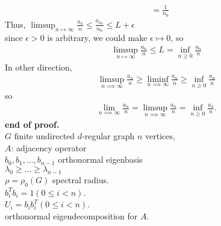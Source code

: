 \documentclass{article}
\begin{document}
\begin{homeworkProblem}
\begin{align}
        &= \frac{ 1 }{ n_0 }
    \end{align}
    Thus, $\limsup_{n \mapsto \infty} \frac{ a_n }{ n } \leq \frac{ a_{n_0} }{ n_0 } \leq L + \epsilon$\\
    since $\epsilon > 0$ is arbitrary, we could make $\epsilon \mapsto 0$, so
    \begin{align}
        \limsup_{n \mapsto \infty} \frac{ a_n }{ n } \leq L = \inf_{n \geq 0} \frac{ a_{n} }{ n }
    \end{align}
    In other direction,
    \begin{align}
        \limsup_{n \implies \infty} \frac{ a_n }{ n } 
        \geq \liminf_{n \implies \infty} \frac{ a_n }{ n } \geq \inf_{n\geq 0} \frac{ a_n }{ n }
    \end{align}
    so 
    \begin{align}
        \lim_{n \implies \infty} \frac{ a_n }{ n } = \limsup_{n \implies \infty} \frac{ a_n }{ n } 
        = \inf_{n\geq 0} \frac{ a_n }{ n }.
    \end{align}
    \textbf{end of proof.}\\

    $G$ finite undirected $d$-regular graph $n$ vertices,\\
    $A$: adjacency operator\\
    $b_0, b_1, \ldots, b_{n-1}$ orthonormal eigenbasis\\
    $\lambda_0 \geq \ldots \geq \lambda_{n-1}$\\
    $\rho = \rho_0 (G)$ spectral radius.\\
    $b_i^T b_i = 1 (0 \leq i < n)$.\\
    $U_i = b_i b_i^T (0 \leq i < n)$.\\
    orthonormal eigendecomposition for $A$.\\

    
    
    
    
    
    
    
    


    



\end{homeworkProblem}

\pagebreak
\end{document}
